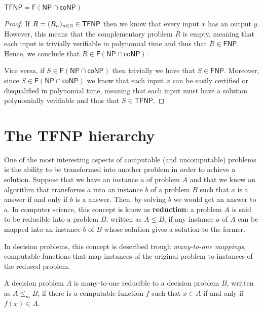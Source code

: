 \begin{proposition}
    \label{tfnp_f_np_conp}
    $\mathsf{TFNP} = \mathsf{F}(\mathsf{NP} \cap \mathsf{coNP})$
\end{proposition}

\begin{proof}
    If $R = (R_n)_{n \in \mathbb{N}} \in \textsf{TFNP}$ then we know that every input $x$ has an output $y$. However, this means that the complementary problem $\overline{R}$ is empty, meaning that each input is trivially verifiable in polynomial time and thus that $\overline{R} \in \textsf{FNP}$. Hence, we conclude that $R \in \mathsf{F}(\mathsf{NP} \cap \mathsf{coNP})$.
    
    Vice versa, if $S \in \mathsf{F}(\mathsf{NP} \cap \mathsf{coNP})$ then trivially we have that $S \in \mathsf{FNP}$. Moreover, since $S \in \mathsf{F}(\mathsf{NP} \cap \mathsf{coNP})$ we know that each input $x$ can be easily certified or disqualified in polynomial time, meaning that each input must have a solution polynomially verifiable and thus that $S \in \mathsf{TFNP}$.

\end{proof}

\newpage

\section{The \textsf{TFNP} hierarchy}

One of the most interesting aspects of computable (and uncomputable) problems is the ability to be transformed into another problem in order to achieve a solution. Suppose that we have an instance $a$ of problem $A$ and that we know an algorithm that transforms $a$ into an instance $b$ of a problem $B$ such that $a$ is a  answer if and only if $b$ is a  answer. Then, by solving $b$ we would get an answer to $a$. In computer science, this concept is know as \textbf{reduction}: a problem $A$ is said to be reducible into a problem $B$, written as $A \leq B$, if any instance $a$ of $A$ can be mapped into an instance $b$ of $B$ whose solution gives a solution to the former.

In decision problems, this concept is described trough \textit{many-to-one mappings}, computable functions that map instances of the original problem to instances of the reduced problem.

\begin{definition}
    A decision problem $A$ is many-to-one reducible to a decision problem $B$, written as $A \leq_m B$, if there is a computable function $f$ such that $x \in A$ if and only if $f(x) \in A$. 
\end{definition}

